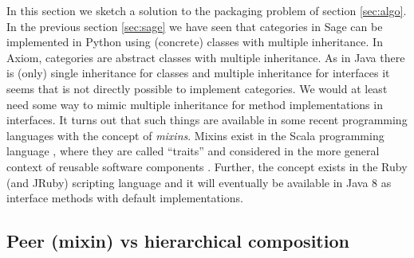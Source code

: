 \documentclass{llncs}
\begin{document}

In this section we sketch a solution to the packaging problem of
section \ref{sec:algo}.  In the previous section \ref{sec:sage} we
have seen that categories in Sage can be implemented in Python using
(concrete) classes with multiple inheritance. In Axiom, categories are
abstract classes with multiple inheritance.  As in Java there is
(only) single inheritance for classes and multiple inheritance for
interfaces it seems that is not directly possible to implement categories.
%
%
We would at least need some way to mimic multiple inheritance for
method implementations in interfaces. It turns out that such things
are available in some recent programming languages with the concept
of {\em mixins}. Mixins exist in the Scala programming language
\cite{Odersky:2003}, where they are called ``traits'' and considered
in the more general context of reusable software components
\cite{Odersky:2005}. Further, the concept exists in the
Ruby (and JRuby) \cite{Matsumo:1995} scripting language and it will
eventually be available in Java 8 as interface methods with default
implementations.


\subsection{Peer (mixin) vs hierarchical composition} %
\end{document}
